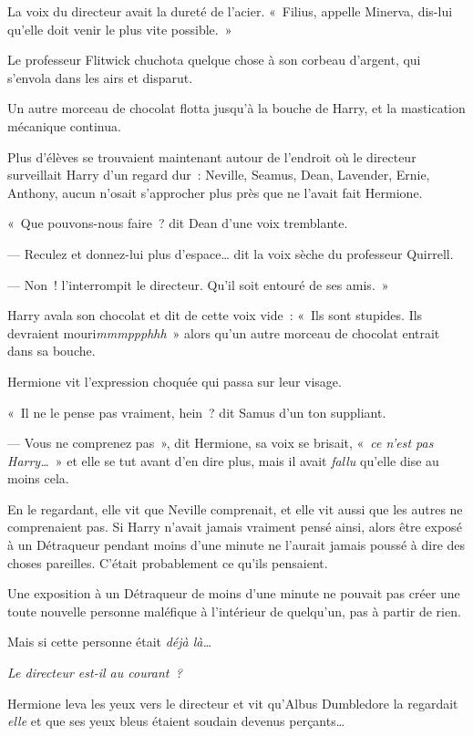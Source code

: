 La voix du directeur avait la dureté de l'acier. «~Filius, appelle Minerva, dis-lui qu'elle doit venir le plus vite possible.~»

Le professeur Flitwick chuchota quelque chose à son corbeau d'argent, qui s'envola dans les airs et disparut.

Un autre morceau de chocolat flotta jusqu'à la bouche de Harry, et la mastication mécanique continua.

Plus d'élèves se trouvaient maintenant autour de l'endroit où le directeur surveillait Harry d'un regard dur~: Neville, Seamus, Dean, Lavender, Ernie, Anthony, aucun n'osait s'approcher plus près que ne l'avait fait Hermione.

«~Que pouvons-nous faire~? dit Dean d'une voix tremblante.

--- Reculez et donnez-lui plus d'espace… dit la voix sèche du professeur Quirrell.

--- Non~! l'interrompit le directeur. Qu'il soit entouré de ses amis.~»

Harry avala son chocolat et dit de cette voix vide~: «~Ils sont stupides. Ils devraient mouri\emph{mmmppphhh}~» alors qu'un autre morceau de chocolat entrait dans sa bouche.

Hermione vit l'expression choquée qui passa sur leur visage.

«~Il ne le pense pas vraiment, hein~? dit Samus d'un ton suppliant.

--- Vous ne comprenez pas~», dit Hermione, sa voix se brisait, «~\emph{ce n'est pas Harry…}~» et elle se tut avant d'en dire plus, mais il avait \emph{fallu} qu'elle dise au moins cela.

En le regardant, elle vit que Neville comprenait, et elle vit aussi que les autres ne comprenaient pas. Si Harry n'avait jamais vraiment pensé ainsi, alors être exposé à un Détraqueur pendant moins d'une minute ne l'aurait jamais poussé à dire des choses pareilles. C'était probablement ce qu'ils pensaient.

Une exposition à un Détraqueur de moins d'une minute ne pouvait pas créer une toute nouvelle personne maléfique à l'intérieur de quelqu'un, pas à partir de rien.

Mais si cette personne était \emph{déjà là…}

\emph{Le directeur est-il au courant~?}

Hermione leva les yeux vers le directeur et vit qu'Albus Dumbledore la regardait \emph{elle} et que ses yeux bleus étaient soudain devenus perçants…


